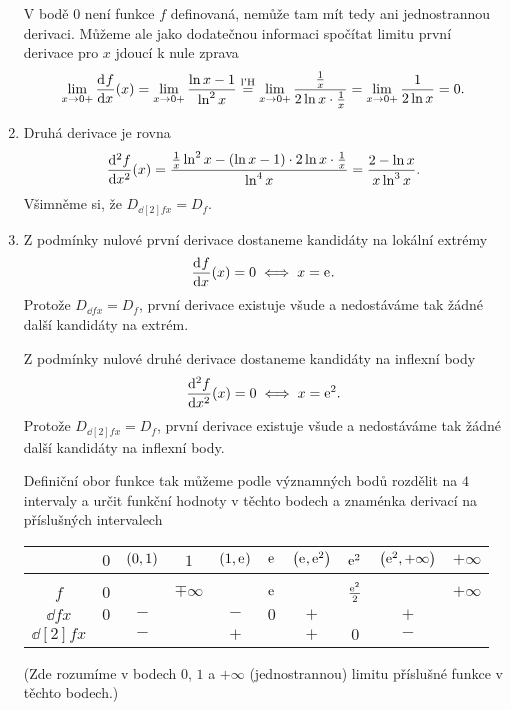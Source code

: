 \documentclass[answers]{exam}
\begin{document}
\begin{questions}
\begin{solution}
\begin{enumerate}
					V bodě $0$ není funkce $f$ definovaná, nemůže tam mít tedy ani jednostrannou derivaci. Můžeme ale jako dodatečnou informaci spočítat limitu první derivace pro $x$ jdoucí k nule zprava
    			\begin{equation*}
    				\lim_{x \to 0+} \dd{f}{x}(x)
    				=
    				\lim_{x \to 0+} \frac{\ln x - 1}{\ln^2 x}
    				\texteq{l'H}
    				\lim_{x \to 0+} \frac{\frac{1}{x}}{2 \ln x \cdot \frac{1}{x}}
    				=
    				\lim_{x \to 0+} \frac{1}{2 \ln x}
    				=
    				0.
    			\end{equation*}
    		
    		\item Druhá derivace je rovna
    			\begin{equation*}
    				\dd[2]{f}{x}(x)
    				=
    				\frac{\frac{1}{x}\ln^2 x - \parens{\ln x - 1} \cdot 2 \ln x \cdot \frac{1}{x}}{\ln^4 x}
    				=
    				\frac{2 - \ln x}{x \ln^3 x}.
    			\end{equation*}
    			Všimněme si, že $D_{\dd[2]{f}{x}} = D_f$.
    			
    		\item Z podmínky nulové první derivace dostaneme kandidáty na lokální extrémy
    		\begin{equation*}
    			\dd{f}{x}(x) = 0 \iff x = \exponential{}.
    		\end{equation*}
    		Protože $D_{\dd{f}{x}} = D_f$, první derivace existuje všude a nedostáváme tak žádné další kandidáty na extrém.
    		
    		Z podmínky nulové druhé derivace dostaneme kandidáty na inflexní body
    		\begin{equation*}
    			\dd[2]{f}{x}(x) = 0 \iff x = \exponential{2}.
    		\end{equation*}
    		Protože $D_{\dd[2]{f}{x}} = D_f$, první derivace existuje všude a nedostáváme tak žádné další kandidáty na inflexní body.
    		    		
    		Definiční obor funkce tak můžeme podle významných bodů rozdělit na $4$ intervaly a určit funkční hodnoty v těchto bodech a znaménka derivací na příslušných intervalech
    		\begin{center}
	    		\begin{tabular}{c|ccccccccc}
	    			& $0$ & $\parens{0, 1}$ & $1$ & $\parens{1, \exponential{}}$ & $\exponential{}$ & $\parens{\exponential{}, \exponential{2}}$ & $\exponential{2}$ & $\parens{\exponential{2}, +\infty}$ & $+\infty$ \\[2pt]
	    			\hline \\[-8pt]
	    			$f$ & $0$ & & $\mp \infty$ & & $\exponential{}$ & & $\frac{\exponential{2}}{2}$ & & $+\infty$ \\[3pt]
	    			$\dd{f}{x}$ & $0$ & $-$ & & $-$ & $0$ & $+$ & & $+$ & \\[3pt]
	    			$\dd[2]{f}{x}$ & & $-$ & & $+$ & & $+$ & $0$ & $-$ &
	    		\end{tabular}
    		\end{center}
    		(Zde rozumíme  v bodech $0$, $1$ a $+\infty$ (jednostrannou) limitu příslušné funkce v těchto bodech.)
    		

\end{enumerate}
\end{solution}
\end{questions}
\end{document}
